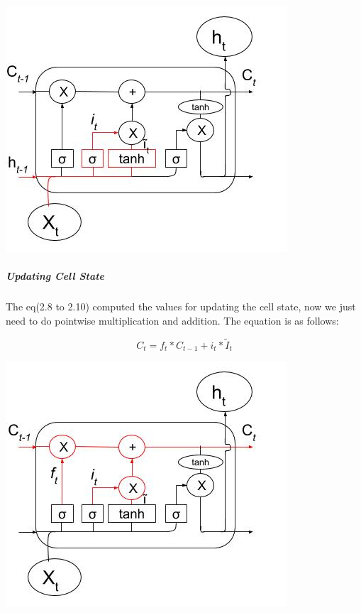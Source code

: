 				\begin{center}
				\includegraphics[width=\linewidth]{figures/Input-gate.jpg}	
				\label{fig: Input Gate}
				\end{center}

\subparagraph{Updating Cell State}

The eq(2.8 to 2.10) computed the values for updating the cell state, now we just need to do pointwise multiplication and addition. The equation is as follows:

\begin{equation}
		C_{t} = f_{t} * C_{t-1} + i_{t} * \tilde{I}_{t}
\end{equation}

				\begin{center}
				\includegraphics[width=\linewidth]{figures/update-to-new-cell-state.jpg}	
				\label{fig: Update to new cell state}
				\end{center}



